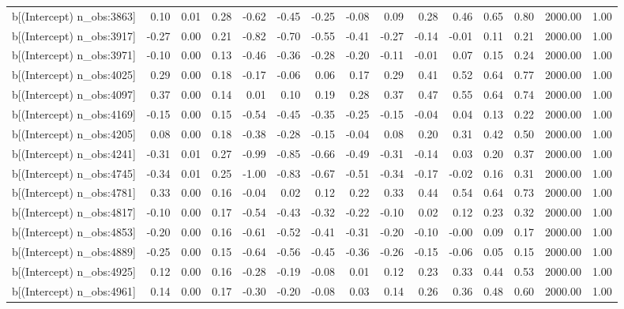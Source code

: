 \begin{table}[ht]
\begin{tabular}{rrrrrrrrrrrrrrr}
  b[(Intercept) n\_obs:3863] & 0.10 & 0.01 & 0.28 & -0.62 & -0.45 & -0.25 & -0.08 & 0.09 & 0.28 & 0.46 & 0.65 & 0.80 & 2000.00 & 1.00 \\ 
  b[(Intercept) n\_obs:3917] & -0.27 & 0.00 & 0.21 & -0.82 & -0.70 & -0.55 & -0.41 & -0.27 & -0.14 & -0.01 & 0.11 & 0.21 & 2000.00 & 1.00 \\ 
  b[(Intercept) n\_obs:3971] & -0.10 & 0.00 & 0.13 & -0.46 & -0.36 & -0.28 & -0.20 & -0.11 & -0.01 & 0.07 & 0.15 & 0.24 & 2000.00 & 1.00 \\ 
  b[(Intercept) n\_obs:4025] & 0.29 & 0.00 & 0.18 & -0.17 & -0.06 & 0.06 & 0.17 & 0.29 & 0.41 & 0.52 & 0.64 & 0.77 & 2000.00 & 1.00 \\ 
  b[(Intercept) n\_obs:4097] & 0.37 & 0.00 & 0.14 & 0.01 & 0.10 & 0.19 & 0.28 & 0.37 & 0.47 & 0.55 & 0.64 & 0.74 & 2000.00 & 1.00 \\ 
  b[(Intercept) n\_obs:4169] & -0.15 & 0.00 & 0.15 & -0.54 & -0.45 & -0.35 & -0.25 & -0.15 & -0.04 & 0.04 & 0.13 & 0.22 & 2000.00 & 1.00 \\ 
  b[(Intercept) n\_obs:4205] & 0.08 & 0.00 & 0.18 & -0.38 & -0.28 & -0.15 & -0.04 & 0.08 & 0.20 & 0.31 & 0.42 & 0.50 & 2000.00 & 1.00 \\ 
  b[(Intercept) n\_obs:4241] & -0.31 & 0.01 & 0.27 & -0.99 & -0.85 & -0.66 & -0.49 & -0.31 & -0.14 & 0.03 & 0.20 & 0.37 & 2000.00 & 1.00 \\ 
  b[(Intercept) n\_obs:4745] & -0.34 & 0.01 & 0.25 & -1.00 & -0.83 & -0.67 & -0.51 & -0.34 & -0.17 & -0.02 & 0.16 & 0.31 & 2000.00 & 1.00 \\ 
  b[(Intercept) n\_obs:4781] & 0.33 & 0.00 & 0.16 & -0.04 & 0.02 & 0.12 & 0.22 & 0.33 & 0.44 & 0.54 & 0.64 & 0.73 & 2000.00 & 1.00 \\ 
  b[(Intercept) n\_obs:4817] & -0.10 & 0.00 & 0.17 & -0.54 & -0.43 & -0.32 & -0.22 & -0.10 & 0.02 & 0.12 & 0.23 & 0.32 & 2000.00 & 1.00 \\ 
  b[(Intercept) n\_obs:4853] & -0.20 & 0.00 & 0.16 & -0.61 & -0.52 & -0.41 & -0.31 & -0.20 & -0.10 & -0.00 & 0.09 & 0.17 & 2000.00 & 1.00 \\ 
  b[(Intercept) n\_obs:4889] & -0.25 & 0.00 & 0.15 & -0.64 & -0.56 & -0.45 & -0.36 & -0.26 & -0.15 & -0.06 & 0.05 & 0.15 & 2000.00 & 1.00 \\ 
  b[(Intercept) n\_obs:4925] & 0.12 & 0.00 & 0.16 & -0.28 & -0.19 & -0.08 & 0.01 & 0.12 & 0.23 & 0.33 & 0.44 & 0.53 & 2000.00 & 1.00 \\ 
  b[(Intercept) n\_obs:4961] & 0.14 & 0.00 & 0.17 & -0.30 & -0.20 & -0.08 & 0.03 & 0.14 & 0.26 & 0.36 & 0.48 & 0.60 & 2000.00 & 1.00 \\ 

\end{tabular}
\end{table}
